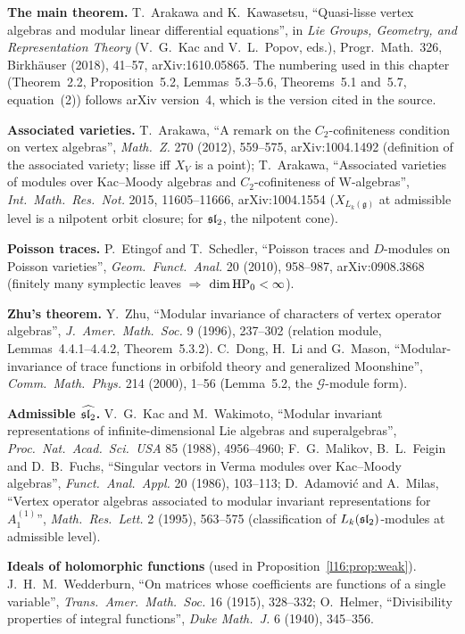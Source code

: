 \textbf{The main theorem.} T.~Arakawa and K.~Kawasetsu, ``Quasi-lisse vertex algebras and modular linear differential
equations'', in \emph{Lie Groups, Geometry, and Representation Theory} (V.~G.~Kac and V.~L.~Popov, eds.), Progr.\ Math.\ 326,
Birkh\"auser (2018), 41--57, arXiv:1610.05865. The numbering used in this chapter (Theorem~2.2, Proposition~5.2,
Lemmas~5.3--5.6, Theorems~5.1 and~5.7, equation~(2)) follows arXiv version~4, which is the version cited in the source.

\textbf{Associated varieties.} T.~Arakawa, ``A remark on the $C_2$-cofiniteness condition on vertex algebras'', \emph{Math.\
Z.} 270 (2012), 559--575, arXiv:1004.1492 (definition of the associated variety; lisse iff $X_V$ is a point); T.~Arakawa,
``Associated varieties of modules over Kac--Moody algebras and $C_2$-cofiniteness of W-algebras'', \emph{Int.\ Math.\ Res.\
Not.} 2015, 11605--11666, arXiv:1004.1554 ($X_{L_k(\mathfrak g)}$ at admissible level is a nilpotent orbit closure; for
$\mathfrak{sl}_2$, the nilpotent cone).

\textbf{Poisson traces.} P.~Etingof and T.~Schedler, ``Poisson traces and $D$-modules on Poisson varieties'',
\emph{Geom.\ Funct.\ Anal.} 20 (2010), 958--987, arXiv:0908.3868 (finitely many symplectic leaves $\Rightarrow$
$\dim\mathrm{HP}_0<\infty$).

\textbf{Zhu's theorem.} Y.~Zhu, ``Modular invariance of characters of vertex operator algebras'', \emph{J.\ Amer.\ Math.\
Soc.} 9 (1996), 237--302 (relation module, Lemmas~4.4.1--4.4.2, Theorem~5.3.2). C.~Dong, H.~Li and G.~Mason,
``Modular-invariance of trace functions in orbifold theory and generalized Moonshine'', \emph{Comm.\ Math.\ Phys.} 214
(2000), 1--56 (Lemma~5.2, the $\mathcal G$-module form).

\textbf{Admissible $\widehat{\mathfrak{sl}_2}$.} V.~G.~Kac and M.~Wakimoto, ``Modular invariant representations of
infinite-dimensional Lie algebras and superalgebras'', \emph{Proc.\ Nat.\ Acad.\ Sci.\ USA} 85 (1988), 4956--4960;
F.~G.~Malikov, B.~L.~Feigin and D.~B.~Fuchs, ``Singular vectors in Verma modules over Kac--Moody algebras'', \emph{Funct.\
Anal.\ Appl.} 20 (1986), 103--113; D.~Adamovi\'c and A.~Milas, ``Vertex operator algebras associated to modular invariant
representations for $A_1^{(1)}$'', \emph{Math.\ Res.\ Lett.} 2 (1995), 563--575 (classification of $L_k(\mathfrak{sl}_2)$-modules
at admissible level).

\textbf{Ideals of holomorphic functions} (used in Proposition~\ref{l16:prop:weak}). J.~H.~M.~Wedderburn, ``On matrices whose
coefficients are functions of a single variable'', \emph{Trans.\ Amer.\ Math.\ Soc.} 16 (1915), 328--332; O.~Helmer,
``Divisibility properties of integral functions'', \emph{Duke Math.\ J.} 6 (1940), 345--356.


